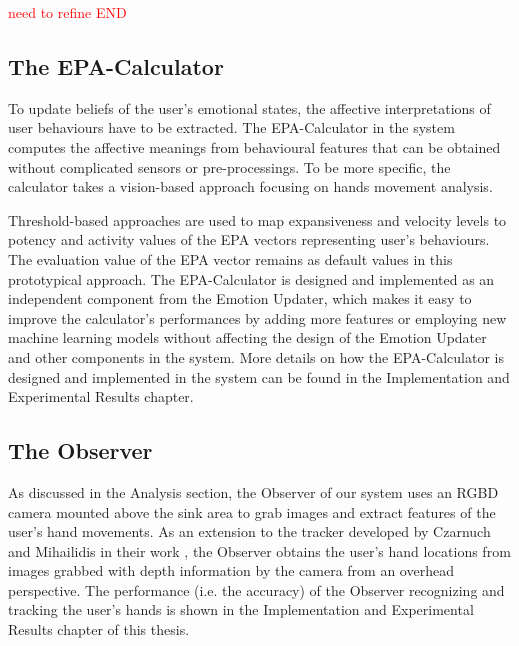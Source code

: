 \textcolor{red}{need to refine END}

\subsection{The EPA-Calculator}

To update beliefs of the user's emotional states, the affective interpretations of user behaviours have to be extracted. The EPA-Calculator in the system computes the affective meanings from behavioural features that can be obtained without complicated sensors or pre-processings. To be more specific, the calculator takes a vision-based approach focusing on hands movement analysis.

Threshold-based approaches are used to map expansiveness and velocity levels to potency and activity values of the EPA vectors representing user's behaviours. The evaluation value of the EPA vector remains as default values in this prototypical approach. The EPA-Calculator is designed and implemented as an independent component from the Emotion Updater, which makes it easy to improve the calculator's performances by adding more features or employing new machine learning models without affecting the design of the Emotion Updater and other components in the system. More details on how the EPA-Calculator is designed and implemented in the system can be found in the Implementation and Experimental Results chapter.

\subsection{The Observer}

As discussed in the Analysis section, the Observer of our system uses an RGBD camera mounted above the sink area to grab images and extract features of the user's hand movements. As an extension to the tracker developed by Czarnuch and Mihailidis in their work \cite{czarnuch2014}, the Observer obtains the user's hand locations from images grabbed with depth information by the camera from an overhead perspective. The performance (i.e. the accuracy) of the Observer recognizing and tracking the user's hands is shown in the Implementation and Experimental Results chapter of this thesis. 

